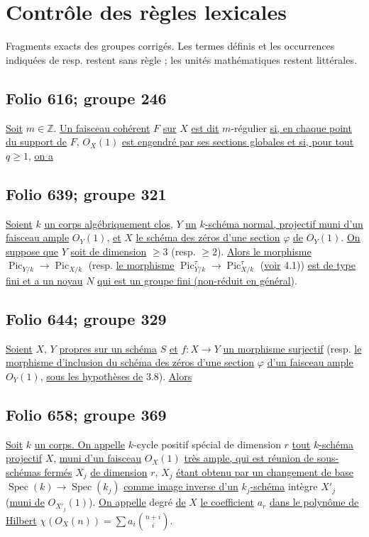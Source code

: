 \documentclass[11pt]{article}
\newcommand{\Pic}{\operatorname{Pic}}
\begin{document}
\section*{Contrôle des règles lexicales}
Fragments exacts des groupes corrigés. Les termes définis et les occurrences indiquées de resp. restent sans règle ; les unités mathématiques restent littérales.
\subsection*{Folio 616; groupe 246}
\uline{Soit} $m\in\mathbb Z$. \uline{Un faisceau coh\'erent} $F$ \uline{sur} $X$ \uline{est dit} $m$-r\'egulier \uline{si, en chaque point du support de} $F$, ${O}_X(1)$ \uline{est engendr\'e par ses sections globales et si, pour tout} $q\ge1$, \uline{on a}

\subsection*{Folio 639; groupe 321}
\uline{Soient} \(k\) \uline{un corps alg\'ebriquement clos}, \(Y\) \uline{un} \(k\)\uline{-sch\'ema normal, projectif muni d'un faisceau ample} \({O}_Y(1)\), \uline{et} \(X\) \uline{le sch\'ema des z\'eros d'une section} \(\varphi\) \uline{de} \({O}_Y(1)\). \uline{On suppose que} \(Y\) \uline{soit de dimension} \(\ge3\) (resp. \(\ge2\)). \uline{Alors le morphisme} \(\Pic_{Y/k}\longrightarrow\Pic_{X/k}\) (resp. \uline{le morphisme} \(\Pic^\tau_{Y/k}\to\Pic^\tau_{X/k}\) (\uline{voir} 4.1)) \uline{est de type fini et a un noyau} \(N\) \uline{qui est un groupe fini (non-r\'eduit en g\'en\'eral}).

\subsection*{Folio 644; groupe 329}
\uline{Soient} \(X\), \(Y\) \uline{propres sur un sch\'ema} \(S\) \uline{et} \(f:X\to Y\) \uline{un morphisme surjectif} (resp. \uline{le morphisme d'inclusion du sch\'ema des z\'eros d'une section} \(\varphi\) \uline{d'un faisceau ample} \({O}_Y(1)\), \uline{sous les hypothèses de} 3.8). \uline{Alors}

\subsection*{Folio 658; groupe 369}
\uline{Soit} $k$ \uline{un corps. On appelle} $k$-cycle positif sp\'ecial de dimension $r$ \uline{tout} $k$\uline{-sch\'ema projectif} $X$, \uline{muni d'un faisceau} ${O}_X(1)$ \uline{tr\`es ample, qui est r\'eunion de sous-sch\'emas ferm\'es} $X_j$ \uline{de dimension} $r$, $X_j$ \uline{\'etant obtenu par un changement de base} $\operatorname{Spec}(k)\to\operatorname{Spec}(k_j)$ \uline{comme image inverse d'un} $k_j$\uline{-sch\'ema} int\`egre $X'_j$ (\uline{muni de} ${O}_{X'_j}(1)$). \uline{On appelle} degr\'e \uline{de} $X$ \uline{le coefficient} $a_r$ \uline{dans le polyn\^ome de Hilbert} $\chi({O}_X(n))=\sum a_i\binom{n+i}{i}$.
\end{document}
